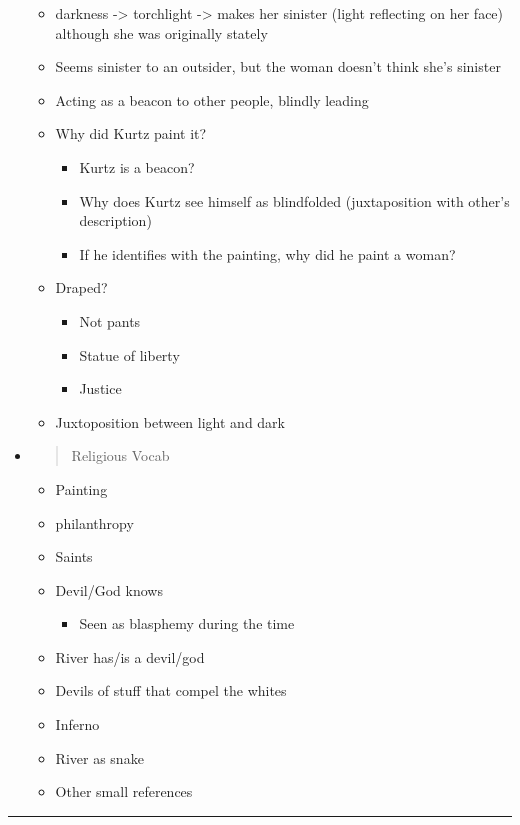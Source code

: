 \documentclass[letterpaper]{article}
\begin{document}
\begin{itemize}
\begin{itemize}
\item darkness -> torchlight -> makes her sinister (light reflecting on
her face) although she was originally stately
\item Seems sinister to an outsider, but the woman doesn't think she's
sinister
\item Acting as a beacon to other people, blindly leading
\item Why did Kurtz paint it?

\begin{itemize}
\item Kurtz is a beacon?
\item Why does Kurtz see himself as blindfolded (juxtaposition with
other's description)
\item If he identifies with the painting, why did he paint a woman?
\end{itemize}

\item Draped?

\begin{itemize}
\item Not pants
\item Statue of liberty
\item Justice
\end{itemize}

\item Juxtoposition between light and dark
\end{itemize}

\item \begin{quote}
Religious Vocab
\end{quote}

\begin{itemize}
\item Painting
\item philanthropy
\item Saints
\item Devil/God knows

\begin{itemize}
\item Seen as blasphemy during the time
\end{itemize}

\item River has/is a devil/god
\item Devils of stuff that compel the whites
\item Inferno
\item River as snake
\item Other small references
\end{itemize}
\end{itemize}

\noindent\rule{\textwidth}{0.5pt}
\end{document}
